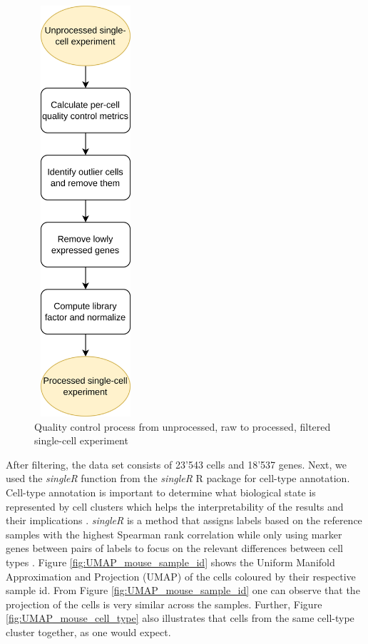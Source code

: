 \begin{figure}[!htb]
\begin{center}
\includegraphics[width=1.5in,height=6in]{figure/qc.png}
\end{center}
\caption{Quality control process from unprocessed, raw to processed, filtered single-cell experiment}
\label{fig:QC}
\end{figure}
\FloatBarrier

After filtering, the data set consists of 23'543 cells and 18'537 genes. Next, we used the \emph{singleR} function from the \emph{singleR} R package \citep{singleR} for cell-type annotation. Cell-type annotation is important to determine what biological state is represented by cell clusters which helps the interpretability of the results and their implications \citep{OSCA}. \emph{singleR} is a method that assigns labels based on the reference samples with the highest Spearman rank correlation while only using marker genes between pairs of labels to focus on the relevant differences between cell types \citep{singleR}. Figure \ref{fig:UMAP_mouse_sample_id} shows the Uniform Manifold Approximation and Projection (UMAP) of the cells coloured by their respective sample id. From Figure \ref{fig:UMAP_mouse_sample_id} one can observe that the projection of the cells is very similar across the samples. Further, Figure \ref{fig:UMAP_mouse_cell_type} also illustrates that cells from the same cell-type cluster together, as one would expect.

